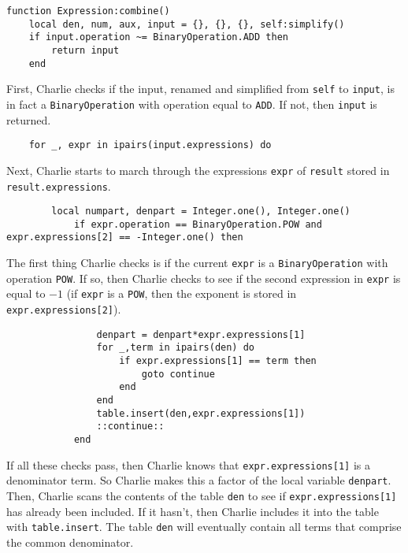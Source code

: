 \documentclass{article}
\begin{document}
\begin{verbatim}
function Expression:combine()
    local den, num, aux, input = {}, {}, {}, self:simplify()
    if input.operation ~= BinaryOperation.ADD then 
        return input
    end
\end{verbatim}

First, Charlie checks if the input, renamed and simplified from \texttt{self} to \texttt{input}, is in fact a \texttt{BinaryOperation} with operation equal to \texttt{ADD}. If not, then \texttt{input} is returned.

\begin{verbatim}
    for _, expr in ipairs(input.expressions) do
\end{verbatim}

Next, Charlie starts to march through the expressions \texttt{expr} of \texttt{result} stored in \texttt{result.expressions}. 

\begin{verbatim}
        local numpart, denpart = Integer.one(), Integer.one()
            if expr.operation == BinaryOperation.POW and expr.expressions[2] == -Integer.one() then 
\end{verbatim}
The first thing Charlie checks is if the current \texttt{expr} is a \texttt{BinaryOperation} with operation \texttt{POW}. If so, then Charlie checks to see if the second expression in \texttt{expr} is equal to $-1$ (if \texttt{expr} is a \texttt{POW}, then the exponent is stored in \texttt{expr.expressions[2]}). 

\begin{verbatim}
                denpart = denpart*expr.expressions[1]
                for _,term in ipairs(den) do 
                    if expr.expressions[1] == term then 
                        goto continue
                    end
                end
                table.insert(den,expr.expressions[1])
                ::continue::
            end
\end{verbatim}

If all these checks pass, then Charlie knows that \texttt{expr.expressions[1]} is a denominator term. So Charlie makes this a factor of the local variable \texttt{denpart}. Then, Charlie scans the contents of the table \texttt{den} to see if \texttt{expr.expressions[1]} has already been included. If it hasn't, then Charlie includes it into the table with \texttt{table.insert}. The table \texttt{den} will eventually contain all terms that comprise the common denominator. 
\end{document}
